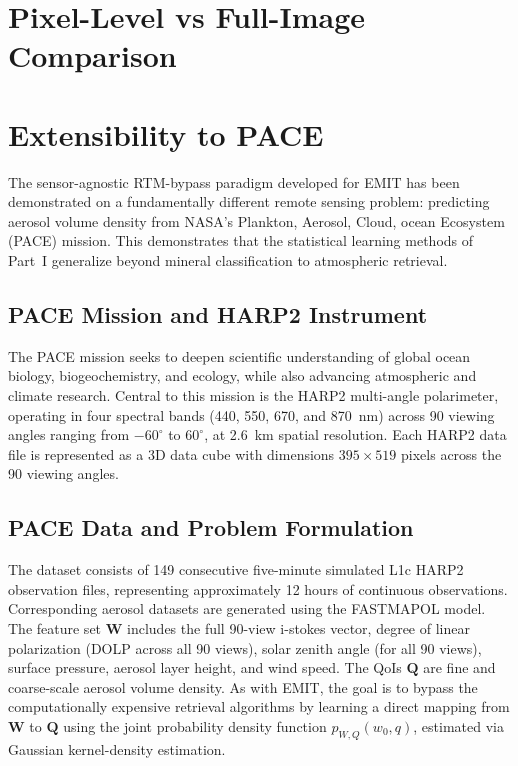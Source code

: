 \documentclass[11pt]{report}
\begin{document}

\section{Pixel-Level vs Full-Image Comparison}


\section{Extensibility to PACE}
\label{sec:pace}

The sensor-agnostic RTM-bypass paradigm developed for EMIT has been demonstrated on a fundamentally different remote sensing problem: predicting aerosol volume density from NASA's Plankton, Aerosol, Cloud, ocean Ecosystem (PACE) mission. This demonstrates that the statistical learning methods of Part~I generalize beyond mineral classification to atmospheric retrieval.

\subsection{PACE Mission and HARP2 Instrument}

The PACE mission seeks to deepen scientific understanding of global ocean biology, biogeochemistry, and ecology, while also advancing atmospheric and climate research. Central to this mission is the HARP2 multi-angle polarimeter, operating in four spectral bands (440, 550, 670, and 870~nm) across 90 viewing angles ranging from $-60^{\circ}$ to $60^{\circ}$, at 2.6~km spatial resolution. Each HARP2 data file is represented as a 3D data cube with dimensions $395 \times 519$ pixels across the 90 viewing angles.

\subsection{PACE Data and Problem Formulation}

The dataset consists of 149 consecutive five-minute simulated L1c HARP2 observation files, representing approximately 12 hours of continuous observations. Corresponding aerosol datasets are generated using the FASTMAPOL model. The feature set $\mathbf{W}$ includes the full 90-view i-stokes vector, degree of linear polarization (DOLP across all 90 views), solar zenith angle (for all 90 views), surface pressure, aerosol layer height, and wind speed. The QoIs $\mathbf{Q}$ are fine and coarse-scale aerosol volume density. As with EMIT, the goal is to bypass the computationally expensive retrieval algorithms by learning a direct mapping from $\mathbf{W}$ to $\mathbf{Q}$ using the joint probability density function $p_{W,Q}(w_0,q)$, estimated via Gaussian kernel-density estimation.
\end{document}
